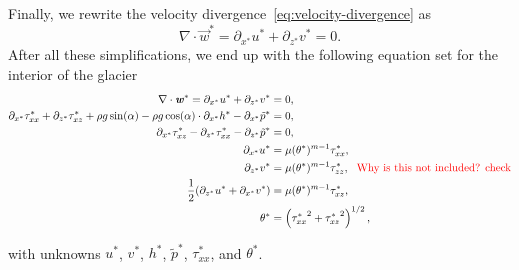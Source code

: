 %
Finally, we rewrite the velocity divergence~\eqref{eq:velocity-divergence} as
%
\begin{equation*}
  \nabla \cdot \vec{w}^* = \partial_{x^*} u^* + \partial_{z^*} v^* = 0.
\end{equation*}
%
After all these simplifications, we end up with the following equation set for the interior of the glacier
%
\begin{equation} \label{eq:interior_equations}
  \begin{split}
    \nabla \cdot \boldsymbol{\mathit{w}}^* = \partial_{x^*} u^* + \partial_{z^*} v^* &= 0, \\
    \partial_{x^*} \tau_{xx}^* + \partial_{z^*} \tau_{xz}^* + \rho g \sin(\alpha) - \rho g \cos(\alpha) \cdot \partial_{x^*} h^* - \partial_{x^*} \tilde{p}^* &= 0, \\
    \partial_{x^*} \tau_{xz}^* - \partial_{z^*} \tau_{xx}^* - \partial_{z^*} \tilde{p}^* &= 0, \\
    \partial_{x^*} u^* &= \mu(\theta^*)^{m-1} \tau_{xx}^*, \\
    \partial_{z^*} v^* &= \mu(\theta^*)^{m-1} \tau_{zz}^*, \text{\textcolor{red}{~~Why is this not included? check}}\\
    \frac{1}{2}(\partial_{z^*} u^* + \partial_{x^*} v^*) &= \mu(\theta^*)^{m-1} \tau_{xz}^*, \\
    \theta^* &= \left( {\tau_{xx}^*}^2 + {\tau_{xz}^*}^2 \right) ^{1/2},
  \end{split}
\end{equation}

with unknowns $u^*$, $v^*$, $h^*$, $\tilde{p}^*$, $\tau_{xx}^*$, and $\theta^*$.
